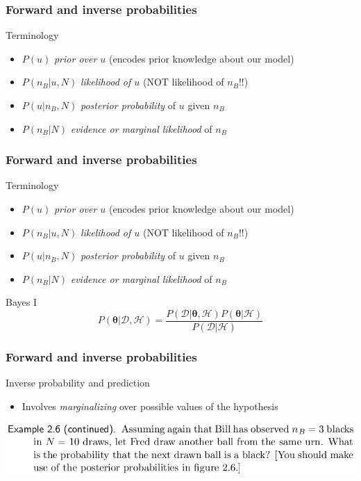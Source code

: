 \documentclass{beamer}
\begin{document}
\begin{frame}
	\frametitle{Forward and inverse probabilities}
	Terminology
	\begin{itemize}[<+->]
	\item $P(u)$ \emph{prior over $u$} (encodes prior knowledge about our model)
	\item $P(n_B|u,N)$ \emph{likelihood of $u$} (NOT likelihood of $n_B$!!)
	\item $P(u|n_B,N)$ \emph{posterior probability} of $u$ given $n_B$
	\item $P(n_B|N)$ \emph{evidence or marginal likelihood} of $n_B$
	\end{itemize}
\end{frame}


\begin{frame}
	\frametitle{Forward and inverse probabilities}
	Terminology
	\begin{itemize}
	\item $P(u)$ \emph{prior over $u$} (encodes prior knowledge about our model)
	\item $P(n_B|u,N)$ \emph{likelihood of $u$} (NOT likelihood of $n_B$!!)
	\item $P(u|n_B,N)$ \emph{posterior probability} of $u$ given $n_B$
	\item $P(n_B|N)$ \emph{evidence or marginal likelihood} of $n_B$
	\end{itemize}
\begin{block}{Bayes I}
$$ P(\boldsymbol{\theta}| \mathcal{D}, \mathcal{H}) = \frac{P(\mathcal{D}|\boldsymbol{\theta}, \mathcal{H})P(\boldsymbol{\theta}|\mathcal{H})}{P(\mathcal{D}|\mathcal{H})}$$
\end{block}
\end{frame}


\begin{frame}
	\frametitle{Forward and inverse probabilities}
	Inverse probability and prediction
	\begin{itemize}
	\item Involves \emph{marginalizing} over possible values of the hypothesis
	\end{itemize}
   \includegraphics[width=.8\textwidth]{e9}
\end{frame}
\end{document}

